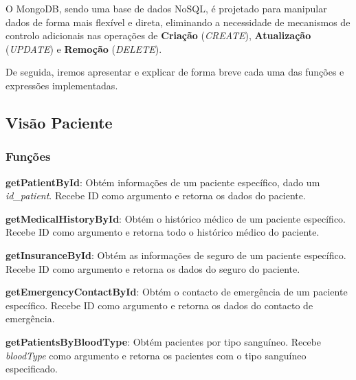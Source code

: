 O MongoDB, sendo uma base de dados NoSQL, é projetado para manipular dados de forma mais flexível e direta, eliminando a necessidade de mecanismos de controlo adicionais nas operações de \textbf{Criação} (\textit{CREATE}), \textbf{Atualização} (\textit{UPDATE}) e \textbf{Remoção} (\textit{DELETE}). 

De seguida, iremos apresentar e explicar de forma breve cada uma das funções e expressões implementadas.


\subsection{Visão Paciente}
\subsubsection{Funções}

\vspace{0.15cm}

\textbf{getPatientById}: Obtém informações de um paciente específico, dado um \textit{id\_patient}. Recebe ID como argumento e retorna os dados do paciente.

\vspace{0.15cm}

\textbf{getMedicalHistoryById}: Obtém o histórico médico de um paciente específico. Recebe ID como argumento e retorna todo o histórico médico do paciente.

\vspace{0.15cm}

\textbf{getInsuranceById}: Obtém as informações de seguro de um paciente específico. Recebe ID como argumento e retorna os dados do seguro do paciente.

\vspace{0.15cm}

\textbf{getEmergencyContactById}: Obtém o contacto de emergência de um paciente específico. Recebe ID como argumento e retorna os dados do contacto de emergência.

\vspace{0.15cm}

\textbf{getPatientsByBloodType}: Obtém pacientes por tipo sanguíneo. Recebe \textit{bloodType} como argumento e retorna os pacientes com o tipo sanguíneo especificado.

